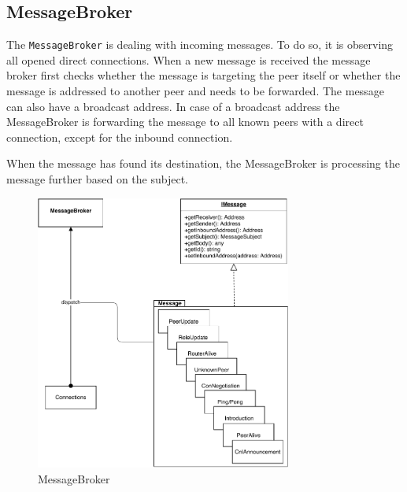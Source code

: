 \subsection{MessageBroker}\label{sec:mit-messageBroker}
The \lstinline|MessageBroker| is dealing with incoming messages. To do so, it is observing all opened direct connections. When a new message is received the message broker first checks whether the message is targeting the peer itself or whether the message is addressed to another peer and needs to be forwarded. The message can also have a broadcast address. In case of a broadcast address the MessageBroker is forwarding the message to all known peers with a direct connection, except for the inbound connection.

When the message has found its destination, the MessageBroker is processing the message further based on the subject.

\begin{figure}
\centering
\includegraphics[width=0.75\textwidth]{graphics/implementation/mitosis-architecture-messages.pdf}
\caption{MessageBroker}
\label{fig:mit-messages}
\end{figure}

